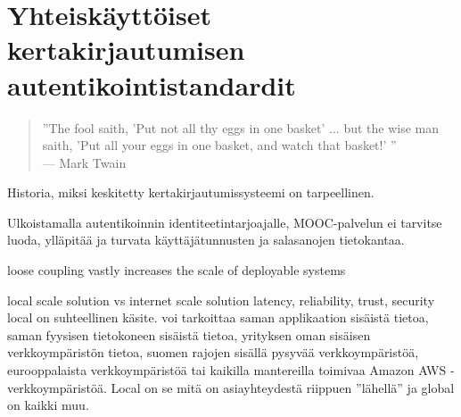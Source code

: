 \documentclass[finnish,gradu]{tktltiki}
\begin{document}


\section{Yhteiskäyttöiset kertakirjautumisen autentikointistandardit} %
\label{sec:Kertakirjautumisstandardit}
  \begin{quote}
      ''The fool saith, 'Put not all thy eggs in one basket' ...
      but the wise man saith, 'Put all your eggs in one basket, and watch that basket!' ''
      \\--- Mark Twain \cite{twain_eggs_1894}
  \end{quote}

  Historia, miksi keskitetty kertakirjautumissysteemi on tarpeellinen.

  Ulkoistamalla autentikoinnin identiteetintarjoajalle, MOOC-palvelun ei tarvitse luoda, ylläpitää ja turvata käyttäjätunnusten ja salasanojen tietokantaa.

  loose coupling vastly increases the scale of deployable systems

  local scale solution vs internet scale solution
  latency, reliability, trust, security
  local on suhteellinen käsite. voi tarkoittaa saman applikaation sisäistä tietoa, saman fyysisen tietokoneen sisäistä tietoa, yrityksen oman sisäisen verkkoympäristön tietoa, suomen rajojen sisällä pysyvää verkkoympäristöä, eurooppalaista verkkoympäristöä tai kaikilla mantereilla toimivaa Amazon AWS -verkkoympäristöä. Local on se mitä on asiayhteydestä riippuen ''lähellä'' ja global on kaikki muu.
\end{document}
